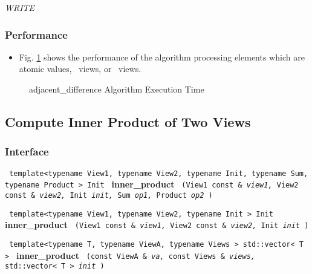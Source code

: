 \textit{WRITE}

\subsubsection{Performance} %

\begin{itemize}
\item
Fig. \ref{fig:adj-diff-alg-exec-exper}
shows the performance of the algorithm processing
elements which are atomic values, \stl\ views, or \stapl\ views.
\end{itemize}

\begin{figure}[p]
\caption{adjacent\_difference Algorithm Execution Time}
\label{fig:adj-diff-alg-exec-exper}
\end{figure}

 

\subsection{Compute Inner Product of Two Views} \label{sec-num-inner}

\subsubsection{Interface} %

\noindent
\texttt{%
template<typename View1, typename View2, typename Init, typename Sum, typename Product > 
\newline
Init 
}
\newline
\textbf{inner\_product}%
\texttt{%
(View1 const \&
\textit{view1,}%
View2 const \&
\textit{view2,}%
Init 
\textit{init,}%
Sum 
\textit{op1,}%
Product 
\textit{op2}%
)
}
\vspace{0.4cm}

\noindent
\texttt{%
template<typename View1, typename View2, typename Init >
\newline
Init 
}
\newline
\textbf{inner\_product}%
\texttt{%
(View1 const \&
\textit{view1,}%
View2 const \&
\textit{view2,}%
Init 
\textit{init}%
)
}
\vspace{0.4cm}
 
\noindent
\texttt{%
template<typename T, typename ViewA, typename Views >
\newline
std::vector< T > 
}
\newline
\textbf{inner\_product}%
\texttt{%
(const ViewA \&
\textit{va,}%
const Views \&
\textit{views,}%
std::vector< T > 
\textit{init}%
)
}

